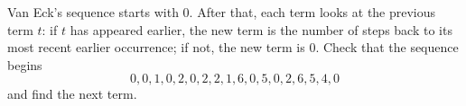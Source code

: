 Van Eck's sequence starts with $0$. After that, each term looks at the previous term $t$: if $t$ has appeared earlier, the new term is the number of steps back to its most recent earlier occurrence; if not, the new term is $0$. Check that the sequence begins
\[0,0,1,0,2,0,2,2,1,6,0,5,0,2,6,5,4,0\]
and find the next term.
